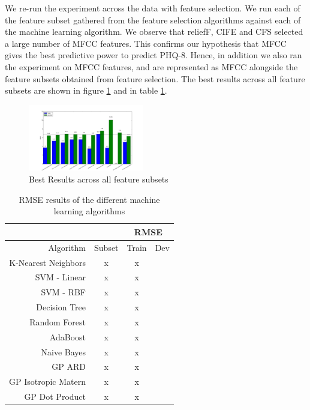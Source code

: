\documentclass{article}
\begin{document}
	We re-run the experiment across the data with feature selection. We run each of the feature subset gathered from the feature selection algorithms against each of the machine learning algorithm. 
	We observe that reliefF, CIFE and CFS selected a large number of MFCC features. This confirms our hypothesis that MFCC gives the best predictive power to predict PHQ-8. Hence, in addition we also ran 
	the experiment on MFCC features, and are represented as MFCC alongside the feature subsets obtained from feature selection. The best results across all feature subsets are shown in figure \ref{results_best} and in table \ref{rmse_results}. 

	\begin{figure}[h]
 		\begin{center}
		\includegraphics[width=0.45\textwidth]{results_best} 
  		\end{center}
  		\caption{Best Results across all feature subsets}
  		\label{results_best}
 	\end{figure}

	\begin{table}[h]
		\begin{center}
			\begin{tabular}{ | r | c | c | c | }
			\hline
			&& \multicolumn{2}{c|}{RMSE} \\ \hline
			Algorithm 		   & Subset& Train & Dev \\ \hline\hline
			K-Nearest Neighbors        & x & x \\ \hline
			SVM - Linear               & x & x \\ \hline
			SVM - RBF                  & x & x \\ \hline
			Decision Tree              & x & x \\ \hline
			Random Forest              & x & x \\ \hline
			AdaBoost                   & x & x \\ \hline
			Naive Bayes                & x & x \\ \hline
			GP ARD                     & x & x \\ \hline
			GP Isotropic Matern        & x & x \\ \hline 
			GP Dot Product             & x & x \\ \hline
			\end{tabular}
		\end{center}
		\caption{RMSE results of the different machine learning algorithms}
		\label{rmse_results}
	\end{table}
\end{document}
